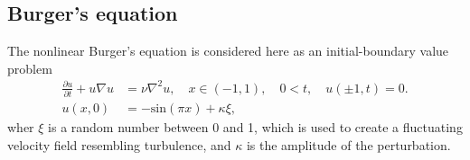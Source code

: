 \subsection{Burger's equation}
\label{sec:burgers}
The nonlinear Burger's equation is considered here as an initial-boundary value problem
\begin{align}
 \frac{\partial u}{\partial t}+u\nabla u &= \nu \nabla^2 u, \quad x \in (-1,1), \quad 0<t, \quad u(\pm 1,t)=0. \\
 u(x,0) &=-\text{sin}(\pi x)+\kappa \xi,
\label{eq:burgers}
\end{align}
wher $\xi$ is a random number between 0 and 1, which is used to create a fluctuating velocity field resembling turbulence, and $\kappa$ is the amplitude of the perturbation. %

